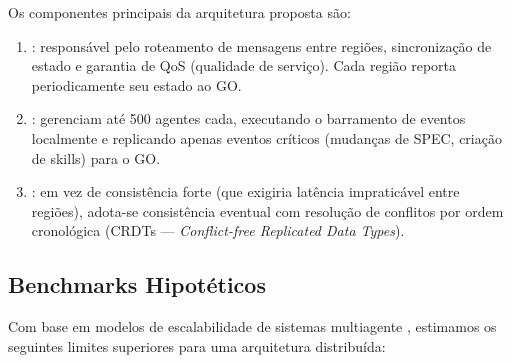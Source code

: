 Os componentes principais da arquitetura proposta são:

\begin{enumerate}
    \item {}: responsável pelo
    roteamento de mensagens entre regiões, sincronização de estado
    e garantia de QoS (qualidade de serviço). Cada região reporta
    periodicamente seu estado ao GO.

    \item {}: gerenciam até
    500 agentes cada, executando o barramento de eventos localmente
    e replicando apenas eventos críticos (mudanças de SPEC, criação
    de skills) para o GO.

    \item {}: em vez de
    consistência forte (que exigiria latência impraticável entre
    regiões), adota-se consistência eventual com resolução de
    conflitos por ordem cronológica (CRDTs --- \textit{Conflict-free
    Replicated Data Types}).
\end{enumerate}

\subsection{Benchmarks Hipotéticos}

Com base em modelos de escalabilidade de sistemas multiagente
\cite{stone2000multiagent}, estimamos os seguintes limites superiores
para uma arquitetura distribuída:

\begin{table}[htb]
\centering
\caption{Benchmarks hipotéticos de escalabilidade}
\label{tab:benchmarks-escala}
\small
\end{table}


